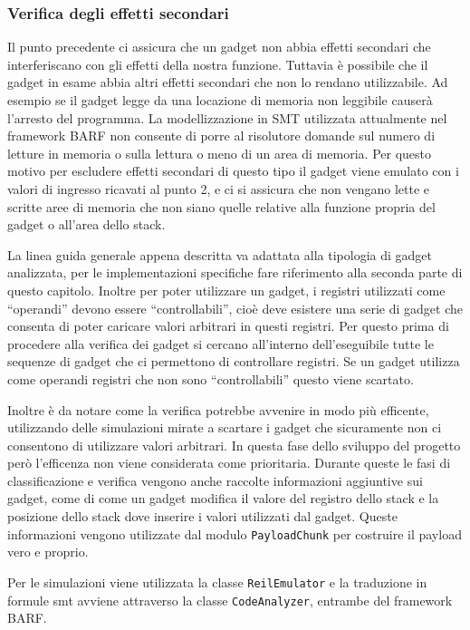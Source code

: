 \subsubsection{Verifica degli effetti secondari}  

Il punto precedente ci assicura che un gadget non abbia effetti
secondari che interferiscano con gli effetti della nostra
funzione. Tuttavia è possibile che il gadget in esame abbia altri
effetti secondari che non lo rendano utilizzabile. Ad esempio se il
gadget legge da una locazione di memoria non leggibile causerà
l'arresto del programma. La modellizzazione in SMT utilizzata
attualmente nel framework BARF non consente di porre al risolutore
domande sul numero di letture in memoria o sulla lettura o meno di
un area di memoria. Per questo motivo per escludere effetti
secondari di questo tipo il gadget viene emulato con i valori di
ingresso ricavati al punto 2, e ci si assicura che non vengano lette
e scritte aree di memoria che non siano quelle relative alla
funzione propria del gadget o all'area dello stack.


La linea guida generale appena descritta va adattata alla tipologia di
gadget analizzata, per le implementazioni specifiche fare riferimento
alla seconda parte di questo capitolo. Inoltre per poter utilizzare un
gadget, i registri utilizzati come ``operandi'' devono essere
``controllabili'', cioè deve esistere una serie di gadget che consenta
di poter caricare valori arbitrari in questi registri. Per questo
prima di procedere alla verifica dei gadget si cercano all'interno
dell'eseguibile tutte le sequenze di gadget che ci permettono di
controllare registri. Se un gadget utilizza come operandi registri che
non sono ``controllabili'' questo viene scartato.

Inoltre è da notare come la verifica potrebbe avvenire in modo più
efficente, utilizzando delle simulazioni mirate a scartare i gadget
che sicuramente non ci consentono di utilizzare valori arbitrari. In
questa fase dello sviluppo del progetto però l'efficenza non viene
considerata come prioritaria.  Durante queste le fasi di
classificazione e verifica vengono anche raccolte informazioni
aggiuntive sui gadget, come di come un gadget modifica il valore del
registro dello stack e la posizione dello stack dove inserire i valori
utilizzati dal gadget. Queste informazioni vengono utilizzate dal
modulo \lstinline{PayloadChunk} per costruire il payload vero e proprio.


Per le simulazioni viene utilizzata la classe \lstinline{ReilEmulator}
e la traduzione in formule smt avviene attraverso la classe
\lstinline{CodeAnalyzer}, entrambe del framework BARF.


